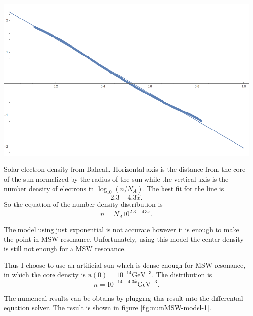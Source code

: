 \documentclass{tufte-handout}
\begin{document}
\begin{marginfigure}
\centering
\includegraphics{assets/solar-electron-dist}
\caption{Solar electron density from Bahcall. 
Horizontal axis is the distance from the core of the sun normalized by the radius of the sun while the vertical axis is the number density of electrons in $\log_{10}(n/N_A)$.
The best fit for the line is 
$$ 2.3-4.3 \hat x .$$
So the equation of the number density distribution is
$$n = N_A 10^{2.3 - 4.3\hat x } .$$ }
\label{fig:solar-electron-dist}
\end{marginfigure}

The model using just exponential is not accurate however it is enough to make the point in MSW resonance. {\color{red}Unfortunately, using this model the center density is still not enough for a MSW resonance.}

{\color{red}Thus I choose to use an artificial sun which is dense enough for MSW resonance, in which the core density is $n(0) = 10^{-14}\mathrm{GeV}^{-3}$. The distribution is \begin{equation*}
n =  10^{-14 - 4.3\hat x} \mathrm{GeV}^{-3}.
\end{equation*}}


The numerical results can be obtains by plugging this result into the differential equation solver. The result is shown in figure \ref{fig:numMSW-model-1}.
\end{document}
